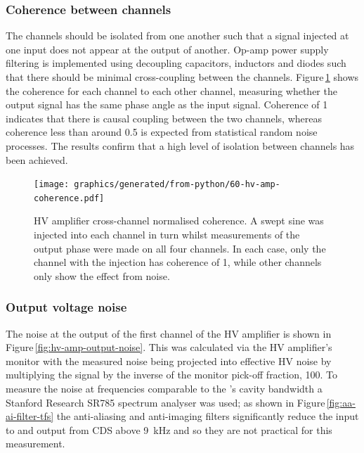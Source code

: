 \subsubsection{Coherence between channels}
The channels should be isolated from one another such that a signal injected at one input does not appear at the output of another. Op-amp power supply filtering is implemented using decoupling capacitors, inductors and diodes such that there should be minimal cross-coupling between the channels. Figure\,\ref{fig:hv-amp-coherence} shows the coherence for each channel to each other channel, measuring whether the output signal has the same phase angle as the input signal. Coherence of \num{1} indicates that there is causal coupling between the two channels, whereas coherence less than around \num{0.5} is expected from statistical random noise processes. The results confirm that a high level of isolation between channels has been achieved.

\begin{figure}
  \centering
  \texttt{[image: graphics/generated/from-python/60-hv-amp-coherence.pdf]}
  \caption[High voltage amplifier cross-channel coherence]{\gls{HV} amplifier cross-channel normalised coherence. A swept sine was injected into each channel in turn whilst measurements of the output phase were made on all four channels. In each case, only the channel with the injection has coherence of \num{1}, while other channels only show the effect from noise.}
  \label{fig:hv-amp-coherence}
\end{figure}

\subsubsection{Output voltage noise}
The noise at the output of the first channel of the \gls{HV} amplifier is shown in Figure\,\ref{fig:hv-amp-output-noise}. This was calculated via the \gls{HV} amplifier's monitor with the measured noise being projected into effective \gls{HV} noise by multiplying the signal by the inverse of the monitor pick-off fraction, \num{100}. To measure the noise at frequencies comparable to the \SSMEXPT{}'s cavity bandwidth a Stanford Research SR785 spectrum analyser was used; as shown in Figure\,\ref{fig:aa-ai-filter-tfs} the anti-aliasing and anti-imaging filters significantly reduce the input to and output from \gls{CDS} above \SI{9}{\kilo\hertz} and so they are not practical for this measurement.

